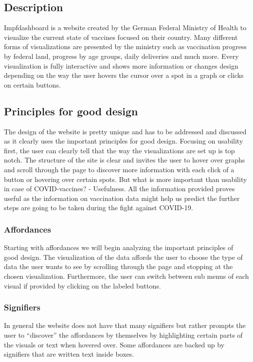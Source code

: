\documentclass[12pt, letterpaper]{article}
\begin{document}
\subsection{Description}
Impfdashboard is a website created by the German Federal Ministry of Health to visualize the current state of vaccines focused on their country. Many different forms of visualizations are presented by the ministry such as vaccination progress by federal land, progress by age groups, daily deliveries and much more. Every visualization is fully interactive and shows more information or changes design depending on the way the user hovers the cursor over a spot in a graph or clicks on certain buttons. 

\subsection{Principles for good design}
The design of the website is pretty unique and has to be addressed and discussed as it clearly uses the important principles for good design.
Focusing on usability first, the user can clearly tell that the way the visualizations are set up is top notch. The structure of the site is clear and invites the user to hover over graphs and scroll through the page to discover more information with each click of a button or hovering over certain spots. But what is more important than usability in case of COVID-vaccines? - Usefulness. All the information provided proves useful as the information on vaccination data might help us predict the further steps are going to be taken during the fight against COVID-19.

\subsubsection{Affordances}
Starting with affordances we will begin analyzing the important principles of good design. The visualization of the data affords the user to choose the type of data the user wants to see by scrolling through the page and stopping at the chosen visualization. Furthermore, the user can switch between sub menus of each visual if provided by clicking on the labeled buttons.

\subsubsection{Signifiers}
In general the website does not have that many signifiers but rather prompts the user to “discover” the affordances by themselves by highlighting certain parts of the visuals or text when hovered over. Some affordances are backed up by signifiers that are written text inside boxes.
\end{document}
